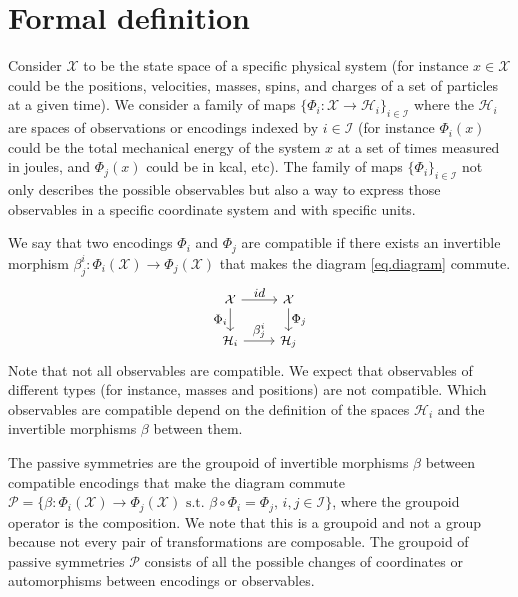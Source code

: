 \documentclass{article}
\theoremstyle{plain}
\theoremstyle{definition}
\theoremstyle{remark}
\begin{document}
\section{Formal definition}\label{sec:definitions}

Consider $\mathcal X$ to be the state space of a specific physical system (for instance $x\in \mathcal X$ could be the positions, velocities, masses, spins, and charges of a set of particles at a given time). 
We consider a family of maps $\{\Phi_i: \mathcal X \to \mathcal H_i\}_{i\in \mathcal I}$ where the $\mathcal H_i$ are spaces of observations or encodings indexed by $i\in \mathcal I$ (for instance $\Phi_i(x)$ could be the total mechanical energy of the system $x$ at a set of times measured in joules, and $\Phi_j(x)$ could be in kcal, etc).
The family of maps $\{\Phi_i\}_{i\in \mathcal I}$ not only describes the possible observables but also a way to express those observables in a specific coordinate system and with specific units. 

We say that two encodings $\Phi_i$ and $\Phi_j$ are compatible if there exists an invertible morphism $\beta_{j}^i:\Phi_i(\mathcal X)\to  \Phi_j(\mathcal X)$ that makes the diagram \eqref{eq.diagram} commute.
\vspace{-1.5ex}
\begin{equation}\label{eq.diagram}
\small
\begin{tikzcd}[every label/.append style = {font = \small}]
  {\cal X}\arrow[r,"id"] \arrow[d,"\Phi_i",swap] & {\cal X}  \arrow[d,"\Phi_j"]\\
{\mathcal H_i} \arrow[r,"\beta_{j}^i"]  & {\mathcal H_j} 
\end{tikzcd}
\vspace{-1.5ex}
\end{equation}
Note that not all observables are compatible. We expect that observables of different types (for instance, masses and positions) are not compatible. Which observables are compatible depend on the definition of the spaces $\mathcal H_i$ and the invertible morphisms $\beta$ between them.

The passive symmetries are the groupoid of invertible morphisms $\beta$ between compatible encodings that make the diagram commute $\mathcal P = \{\beta: \Phi_i(\mathcal X) \to \Phi_j(\mathcal X) \text{ s.t. } \beta\circ \Phi_i = \Phi_j, \, i,j\in \mathcal I \}$, where the groupoid operator is the composition. We note that this is a groupoid and not a group because not every pair of transformations are composable. 
The groupoid of passive symmetries $\mathcal P$ consists of all the possible changes of coordinates or automorphisms between encodings or observables. 
\end{document}
